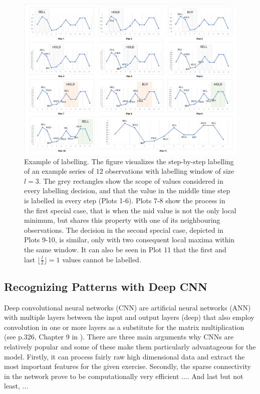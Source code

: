 \documentclass[11pt, a4paper]{article}
\begin{document}
\begin{figure}[ht]
    \centering
    \includegraphics[width=\textwidth]{images/Labelling.png}
    \caption{Example of labelling. The figure visualizes the step-by-step labelling of an example series of $12$ observations with labelling window of size $l=3$. The grey rectangles show the scope of values considered in every labelling decision, and that the value in the middle time step is labelled in every step (Plots 1-6). Plots 7-8 show the process in the first special case, that is when the mid value is not the only local minimum, but shares this property with one of its neighbouring observations. The decision in the second special case, depicted in Plots 9-10, is similar, only with two consequent local maxima within the same window. It can also be seen in Plot 11 that the first and last $\lfloor \frac{l}{2} \rfloor = 1$ values cannot be labelled.}
    \label{fig:Labelling}
\end{figure}

\subsection{Recognizing Patterns with Deep CNN}
\label{subsec:DM:RecPatwCNN}
Deep convolutional neural networks (CNN) are artificial neural networks (ANN) with multiple layers between the input and output layers (deep) that also employ convolution in one or more layers as a substitute for the matrix multiplication (see p.326, Chapter 9 in \cite{goodfellow2016deep}). %
There are three main arguments why CNNs are relatively popular and some of these make them particularly advantageous for the model.
Firstly, it can process fairly raw high dimensional data and extract the most important features for the given exercise. Secondly, the sparse connectivity in the network prove to be computationally very efficient .... And last but not least, ...
\end{document}
